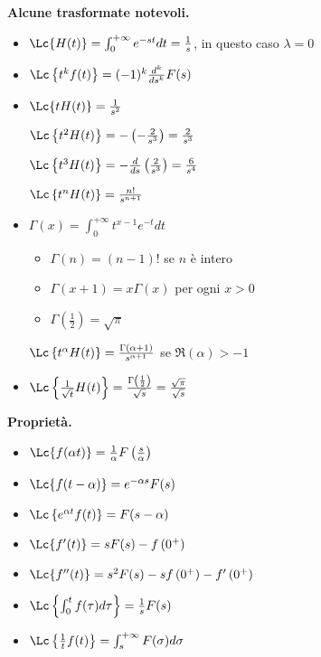 \textbf{Alcune trasformate notevoli.}
\begin{itemize}
\item $\Lc\{H(t)\} = \int^{+ \infty}_{0} e^{- st} dt = \frac{1}{s}$, in questo caso $\lambda = 0$
\item $\Lc\left\{t^{k} f(t)\right\} = (- 1)^{k}\frac{d^{k}}{ds^{k}} F(s)$
\item $\Lc\{tH(t)\} = \frac{1}{s^{2}}$

$\Lc\left\{t^{2} H(t)\right\} = - \left(- \frac{2}{s^{3}}\right) = \frac{2}{s^{3}}$

$\Lc\left\{t^{3} H(t)\right\} = - \frac{d}{ds}\left(\frac{2}{s^{3}}\right) = \frac{6}{s^{4}}$

$\Lc\left\{t^{n} H(t)\right\} = \frac{n!}{s^{n + 1}}$
\item $\Gamma (x) = \int^{+ \infty}_{0} t^{x - 1} e^{- t} dt$
\begin{itemize}
\item $\Gamma (n) = (n - 1) !$ se $n$ è intero
\item $\Gamma (x + 1) = x\Gamma (x)$ per ogni $x > 0$
\item $\Gamma \left(\frac{1}{2}\right) = \sqrt{\pi}$
\end{itemize}

$\Lc\left\{t^{\alpha} H(t)\right\} = \frac{\Gamma (\alpha + 1)}{s^{\alpha + 1}}$ se $\Re (\alpha) > - 1$
\item $\Lc\left\{\frac{1}{\sqrt{t}} H(t)\right\} = \frac{\Gamma \left(\frac{1}{2}\right)}{\sqrt{s}} = \frac{\sqrt{\pi}}{\sqrt{s}}$
\end{itemize}

\textbf{Proprietà.}
\begin{itemize}
\item $\Lc\{f(\alpha t)\} = \frac{1}{\alpha} F\left(\frac{s}{\alpha}\right)$
\item $\Lc\{f(t - \alpha)\} = e^{- \alpha s} F(s)$
\item $\Lc\left\{e^{\alpha t} f(t)\right\} = F(s - \alpha)$
\item $\Lc\{f'(t)\} = sF(s) - f\left(0^{+}\right)$
\item $\Lc\{f''(t)\} = s^{2} F(s) - sf\left(0^{+}\right) - f'\left(0^{+}\right)$
\item $\Lc\left\{\int^{t}_{0} f(\tau) d\tau \right\} = \frac{1}{s} F(s)$
\item $\Lc\left\{\frac{1}{t} f(t)\right\} = \int^{+ \infty}_{s} F(\sigma) d\sigma $
\end{itemize}

